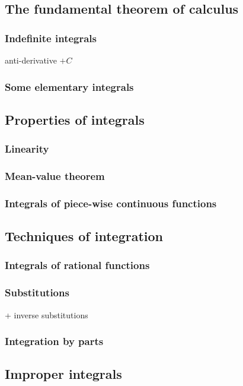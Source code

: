 \subsection{The fundamental theorem of calculus}
\subsubsection{Indefinite integrals}
anti-derivative $+C$
\subsubsection{Some elementary integrals}

\subsection{Properties of integrals}
\subsubsection{Linearity}
\subsubsection{Mean-value theorem}
\subsubsection{Integrals of piece-wise continuous functions}

\subsection{Techniques of integration}
\subsubsection{Integrals of rational functions}
\subsubsection{Substitutions}
+ inverse substitutions
\subsubsection{Integration by parts}


\subsection{Improper integrals}


